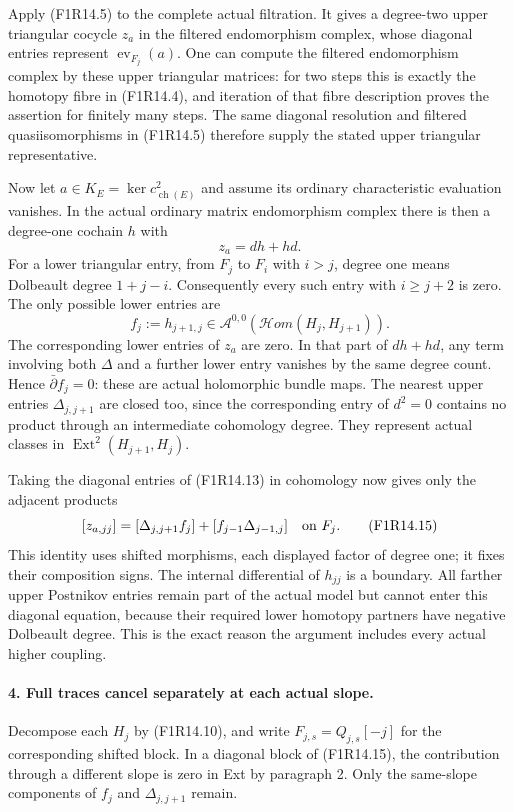 Apply (F1R14.5) to the complete actual filtration. It gives
a degree-two upper triangular cocycle $z_a$ in the filtered
endomorphism complex, whose diagonal entries represent
$\operatorname{ev}_{F_j}(a)$. One can compute the filtered
endomorphism complex by these upper triangular matrices:
for two steps this is exactly the homotopy fibre in
(F1R14.4), and iteration of that fibre description proves
the assertion for finitely many steps. The same diagonal
resolution and filtered quasiisomorphisms in (F1R14.5)
therefore supply the stated upper triangular representative.

Now let $a\in K_E=\ker c^2_{\operatorname{ch}(E)}$ and
assume its ordinary characteristic evaluation vanishes.
In the actual ordinary matrix endomorphism complex there
is then a degree-one cochain $h$ with
\[
                         z_a=d h+h d.
 \tag{F1R14.13}
\]
For a lower triangular entry, from $F_j$ to $F_i$ with
$i>j$, degree one means Dolbeault degree $1+j-i$.
Consequently every such entry with $i\ge j+2$ is zero.
The only possible lower entries are
\[
           f_j:=h_{j+1,j}\in
                    \mathcal A^{0,0}(\mathcal Hom(H_j,H_{j+1})).
 \tag{F1R14.14}
\]
The corresponding lower entries of $z_a$ are zero.
In that part of $d h+h d$, any term involving both
$\Delta$ and a further lower entry vanishes by the same
degree count. Hence $\bar\partial f_j=0$: these are actual
holomorphic bundle maps. The nearest upper entries
$\Delta_{j,j+1}$ are closed too, since the corresponding
entry of $d^2=0$ contains no product through an intermediate
cohomology degree. They represent actual classes in
$\operatorname{Ext}^2(H_{j+1},H_j)$.

Taking the diagonal entries of (F1R14.13) in cohomology
now gives only the adjacent products
\[
 [z_{a,jj}]=
       [\Delta_{j,j+1}f_j]+[f_{j-1}\Delta_{j-1,j}]
                         \quad\hbox{on }F_j.
 \tag{F1R14.15}
\]
This identity uses shifted morphisms, each displayed
factor of degree one; it fixes their composition signs.
The internal differential of $h_{jj}$ is a boundary.
All farther upper Postnikov entries remain part of the
actual model but cannot enter this diagonal equation,
because their required lower homotopy partners have
negative Dolbeault degree. This is the exact reason the
argument includes every actual higher coupling.

\paragraph{4. Full traces cancel separately at each actual slope.}
Decompose each $H_j$ by (F1R14.10), and write
$F_{j,s}=Q_{j,s}[-j]$ for the corresponding shifted block.
In a diagonal block of (F1R14.15), the contribution through
a different slope is zero in Ext by paragraph 2. Only the
same-slope components of $f_j$ and $\Delta_{j,j+1}$ remain.

